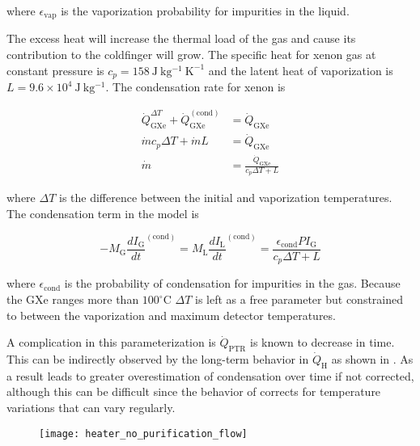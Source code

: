 \noindent where $\epsilon_{\mathrm{vap}}$ is the vaporization probability for impurities in the liquid.

The excess heat will increase the thermal load of the gas and cause its contribution to the coldfinger will grow.  The specific heat for
xenon gas at constant pressure is $c_p = 158\ \mathrm{J\ kg^{-1}\ K^{-1}}$ and the latent heat of vaporization is
$L = 9.6 \times 10^4\ \mathrm{J\ kg^{-1}}$.  The condensation rate for xenon is

\begin{equation}
\begin{aligned}
\dot{Q}_{\mathrm{GXe}}^{\Delta T} + \dot{Q}_{\mathrm{GXe}}^{(\mathrm{cond})} &= \dot{Q}_{\mathrm{GXe}} \\
\dot{m} c_p \Delta T + \dot{m} L &= \dot{Q}_{\mathrm{GXe}} \\
\dot{m} &= \frac{\dot{Q}_{\mathrm{GXe}}}{c_p \Delta T + L}
\end{aligned}
\end{equation}

\noindent where $\Delta T$ is the difference between the initial and vaporization temperatures.  The condensation term in the model is

\begin{equation}
-M_{\mathrm{G}} \frac{dI_{\mathrm{G}}}{dt}^{(\mathrm{cond})} = M_{\mathrm{L}} \frac{dI_{\mathrm{L}}}{dt}^{(\mathrm{cond})} =
\frac{\epsilon_{\mathrm{cond}} P I_{\mathrm{G}}}{c_p \Delta T + L}
\end{equation}

\noindent where $\epsilon_{\mathrm{cond}}$ is the probability of condensation for impurities in the gas.  Because the GXe ranges more
than $100^{\circ}\mathrm{C}$ $\Delta T$ is left as a free parameter but constrained to between the vaporization and maximum detector
temperatures.

A complication in this parameterization is $\dot{Q}_{\mathrm{PTR}}$ is known to decrease in time.  This can be indirectly observed by
the long-term behavior in $\dot{Q}_{\mathrm{H}}$ as shown in .  As a result
 leads to greater overestimation of condensation over time if not
corrected, although this can be difficult since the behavior of \qdh corrects for temperature variations that can vary regularly.

\begin{figure}
\centering
\texttt{[image: heater\_no\_purification\_flow]}
\caption{}
\label{fig:electron_lifetime_model_vap_and_cond_ptr_decrease}
\end{figure}

